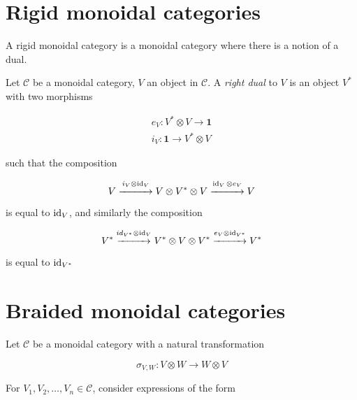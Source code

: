 \section{Rigid monoidal categories}

A rigid monoidal category is a monoidal category where there is a notion of a dual. 

\begin{defn}
    Let $\mathcal{C}$ be a monoidal category, $V$ an object in $\mathcal{C}$. A
    \emph{right dual} to $V$ is an object $V^*$ with two morphisms

    \begin{align}
        e_V: V^* \otimes V \to \mathbf{1}  \\
        i_V: \mathbf{1} \to V^* \otimes V
    \end{align}
\end{defn}

such that the composition

\begin{equation}
    V \stackrel{i_V \otimes \operatorname{id}_V}{\xrightarrow{\hspace*{1cm}}} V \otimes V^*
    \otimes V  \stackrel{\operatorname{id}_V \otimes e_V}{\xrightarrow{\hspace*{1cm}}} V
\end{equation}

is equal to $\operatorname{id}_V$, and similarly the composition

\begin{equation}
    V^* \stackrel{id_{V^*} \otimes \operatorname{id}_V}{\xrightarrow{\hspace*{1cm}}} V^*
    \otimes V \otimes V^*  \stackrel{e_V \otimes
    \operatorname{id}_{V^*}}{\xrightarrow{\hspace*{1cm}}} V^*
\end{equation}

is equal to $\operatorname{id}_{V^*}$

   
\section{Braided monoidal categories}
\label{section:Braiding}

Let $\mathcal{C}$ be a monoidal category with a natural transformation 

\begin{equation}
    \sigma_{V,W} : V \otimes W \to W \otimes V
\end{equation}

For $V_1, V_2, \dots, V_n \in \mathcal{C}$, consider expressions of the form 

